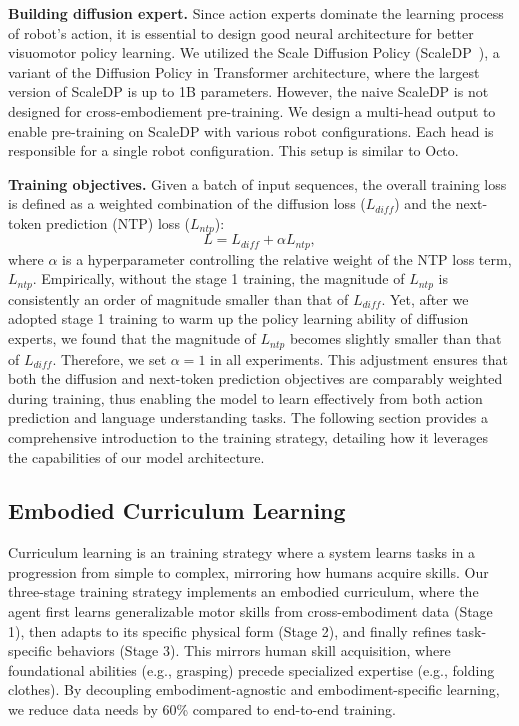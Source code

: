 \textbf{Building diffusion expert.} 
Since action experts dominate the learning process of robot's action, it is essential to design good neural architecture for better visuomotor policy learning. We utilized the Scale Diffusion Policy (ScaleDP~\cite{scaledp}), a variant of the Diffusion Policy in Transformer architecture, where the largest version of ScaleDP is up to 1B parameters. However, the naive ScaleDP is not designed for cross-embodiement pre-training. We design a multi-head output to enable pre-training on ScaleDP with various robot configurations. Each head is responsible for a single robot configuration. This setup is similar to Octo. 

\textbf{Training objectives.} Given a batch of input sequences, the overall training loss is defined as a weighted combination of the diffusion loss ($L_{diff}$) and the next-token prediction (NTP) loss ($L_{ntp}$):
\begin{equation}
    L = L_{diff} + \alpha L_{ntp},
\end{equation}
where $\alpha$ is a hyperparameter controlling the relative weight of the NTP loss term, $L_{ntp}$. Empirically, without the stage 1 training, the magnitude of $L_{ntp}$ is consistently an order of magnitude smaller than that of $L_{diff}$. Yet, after we adopted stage 1 training to warm up the policy learning ability of diffusion experts, we found that the magnitude of $L_{ntp}$ becomes slightly smaller than that of $L_{diff}$. Therefore, we set $\alpha = 1$ in all experiments. This adjustment ensures that both the diffusion and next-token prediction objectives are comparably weighted during training, thus enabling the model to learn effectively from both action prediction and language understanding tasks. The following section provides a comprehensive introduction to the training strategy, detailing how it leverages the capabilities of our model architecture.



\subsection{Embodied Curriculum Learning}
Curriculum learning is an training strategy where a system learns tasks in a progression from simple to complex, mirroring how humans acquire skills. Our three-stage training strategy implements an embodied curriculum, where the agent first learns generalizable motor skills from cross-embodiment data (Stage 1), then adapts to its specific physical form (Stage 2), and finally refines task-specific behaviors (Stage 3). This mirrors human skill acquisition, where foundational abilities (e.g., grasping) precede specialized expertise (e.g., folding clothes). By decoupling embodiment-agnostic and embodiment-specific learning, we reduce data needs by 60\% compared to end-to-end training.




